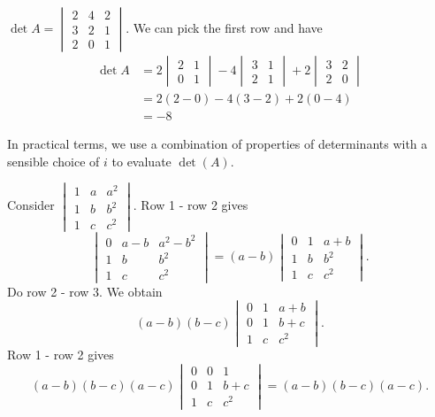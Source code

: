 \documentclass[a4paper]{article}
\begin{document}
\begin{eg}
  $\det A = \begin{vmatrix}2 & 4 & 2\\ 3 & 2 & 1\\ 2 & 0 & 1\end{vmatrix}$. We can pick the first row and have
    \begin{align*}
      \det A&= 2\begin{vmatrix}2 & 1\\0 & 1 \end{vmatrix} - 4\begin{vmatrix} 3 & 1\\ 2 & 1\end{vmatrix} + 2\begin{vmatrix}3 & 2 \\ 2 & 0\end{vmatrix}\\
      &= 2(2 - 0) - 4(3 - 2) + 2(0 - 4)\\
      &= -8
    \end{align*}
\end{eg}

In practical terms, we use a combination of properties of determinants with a sensible choice of $i$ to evaluate $\det(A)$.

\begin{eg}
  Consider $\begin{vmatrix}1 & a & a^2\\1 & b & b^2\\1 & c & c^2 \end{vmatrix}$. Row 1 - row 2 gives
  \[
  \begin{vmatrix}0 & a - b & a^2 - b^2\\1 & b & b^2\\1 & c & c^2 \end{vmatrix} = (a - b)\begin{vmatrix}0 & 1 & a + b\\1 & b & b^2\\1 & c & c^2 \end{vmatrix}.
  \]
  Do row 2 - row 3. We obtain
  \[
  (a - b)(b - c)\begin{vmatrix}0 & 1 & a + b\\0 & 1 & b + c\\1 & c & c^2 \end{vmatrix}.
  \]
  Row 1 - row 2 gives
  \[
  (a - b)(b - c)(a - c)\begin{vmatrix}0 & 0 & 1\\0 & 1 & b + c\\1 & c & c^2 \end{vmatrix} = (a - b)(b - c)(a - c).
  \]
\end{eg}
\end{document}
